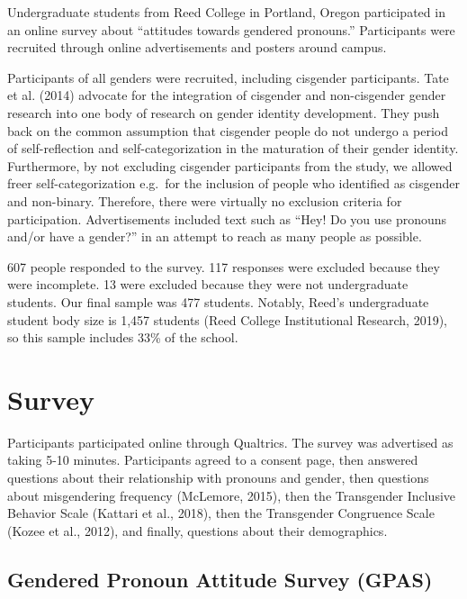 \documentclass[12pt,twoside]{reedthesis}
\begin{document}
Undergraduate students from Reed College in Portland, Oregon participated in an online survey about ``attitudes towards gendered pronouns.'' Participants were recruited through online advertisements and posters around campus.

Participants of all genders were recruited, including cisgender participants. Tate et al. (2014) advocate for the integration of cisgender and non-cisgender gender research into one body of research on gender identity development. They push back on the common assumption that cisgender people do not undergo a period of self-reflection and self-categorization in the maturation of their gender identity. Furthermore, by not excluding cisgender participants from the study, we allowed freer self-categorization e.g.~for the inclusion of people who identified as cisgender and non-binary. Therefore, there were virtually no exclusion criteria for participation. Advertisements included text such as ``Hey! Do you use pronouns and/or have a gender?'' in an attempt to reach as many people as possible.

607 people responded to the survey. 117 responses were excluded because they were incomplete. 13 were excluded because they were not undergraduate students. Our final sample was 477 students. Notably, Reed's undergraduate student body size is 1,457 students (Reed College Institutional Research, 2019), so this sample includes 33\% of the school.

\hypertarget{survey}{%
\section{Survey}\label{survey}}

Participants participated online through Qualtrics. The survey was advertised as taking 5-10 minutes. Participants agreed to a consent page, then answered questions about their relationship with pronouns and gender, then questions about misgendering frequency (McLemore, 2015), then the Transgender Inclusive Behavior Scale (Kattari et al., 2018), then the Transgender Congruence Scale (Kozee et al., 2012), and finally, questions about their demographics.

\hypertarget{gendered-pronoun-attitude-survey-gpas}{%
\subsection{Gendered Pronoun Attitude Survey (GPAS)}\label{gendered-pronoun-attitude-survey-gpas}}
\end{document}
